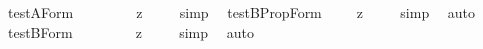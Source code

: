 \begin{isabellebody}
{\isafoldproof}%
%
\isadelimproof
%
\endisadelimproof
\isanewline
{}\isamarkupfalse%
\ test{\isacharunderscore}A{\isacharunderscore}Form{\isacharcolon}\ \ \ \ \ {\isachardoublequoteopen}{\isacharbrackleft}{\isasymforall}{\isacharparenleft}{\isasymlambda}{\isasymphi}{\isachardot}\ {\isacharparenleft}{\isasymbox}\ {\isacharparenleft}{\isasymdiamond}\ {\isacharsemicolon}{\isasymphi}{\isacharsemicolon}{\isacharparenright}{\isacharparenright}\ {\isasymrightarrow}\isactrlsup z\ {\isacharparenleft}{\isasymdiamond}\ {\isacharsemicolon}{\isasymphi}{\isacharsemicolon}{\isacharparenright}{\isacharparenright}{\isacharbrackright}{\isachardoublequoteclose}%
\isadelimproof
\ %
\endisadelimproof
%
\isatagproof
{}\isamarkupfalse%
\ {\isacharparenleft}simp{\isacharparenright}\ \isamarkupfalse%
%
\endisatagproof
{\isafoldproof}%
%
\isadelimproof
%
\endisadelimproof
\isanewline
\isanewline
{}\isamarkupfalse%
\ test{\isacharunderscore}B{\isacharunderscore}PropForm{\isacharcolon}\ {\isachardoublequoteopen}{\isacharbrackleft}{\isasymforall}{\isacharparenleft}{\isasymlambda}{\isasymphi}{\isachardot}\ {\isacharparenleft}{\isasymdiamond}\ {\isacharparenleft}{\isasymbox}\ {\isacharcomma}{\isasymphi}{\isacharcomma}{\isacharparenright}{\isacharparenright}\ {\isasymrightarrow}\isactrlsup z\ {\isacharparenleft}{\isasymdiamond}\ {\isacharcomma}{\isasymphi}{\isacharcomma}{\isacharparenright}{\isacharparenright}{\isacharbrackright}{\isachardoublequoteclose}%
\isadelimproof
\ %
\endisadelimproof
%
\isatagproof
{}\isamarkupfalse%
\ {\isacharparenleft}simp{\isacharparenright}\ \isamarkupfalse%
\ auto%
\endisatagproof
{\isafoldproof}%
%
\isadelimproof
%
\endisadelimproof
\isanewline
{}\isamarkupfalse%
\ test{\isacharunderscore}B{\isacharunderscore}Form{\isacharcolon}\ \ \ \ \ {\isachardoublequoteopen}{\isacharbrackleft}{\isasymforall}{\isacharparenleft}{\isasymlambda}{\isasymphi}{\isachardot}\ {\isacharparenleft}{\isasymdiamond}\ {\isacharparenleft}{\isasymbox}\ {\isacharsemicolon}{\isasymphi}{\isacharsemicolon}{\isacharparenright}{\isacharparenright}\ {\isasymrightarrow}\isactrlsup z\ {\isacharparenleft}{\isasymdiamond}\ {\isacharsemicolon}{\isasymphi}{\isacharsemicolon}{\isacharparenright}{\isacharparenright}{\isacharbrackright}{\isachardoublequoteclose}%
\isadelimproof
\ %
\endisadelimproof
%
\isatagproof
{}\isamarkupfalse%
\ {\isacharparenleft}simp{\isacharparenright}\ \isamarkupfalse%
\ auto%
\endisatagproof
{\isafoldproof}%
%
\isadelimproof
%
\endisadelimproof

\end{isabellebody}
